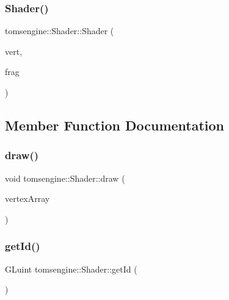 \subsubsection{\texorpdfstring{Shader()}{Shader()}}
{\footnotesize\ttfamily tomsengine\+::\+Shader\+::\+Shader (\begin{DoxyParamCaption}\item[{std\+::string}]{vert,  }\item[{std\+::string}]{frag }\end{DoxyParamCaption})}



\subsection{Member Function Documentation}
\mbox{\label{classtomsengine_1_1_shader_af63fb3f1221631fd17ee7e814eec579c}} 
\subsubsection{\texorpdfstring{draw()}{draw()}}
{\footnotesize\ttfamily void tomsengine\+::\+Shader\+::draw (\begin{DoxyParamCaption}\item[{std\+::shared\+\_\+ptr$<$ \mbox{\hyperlink{classtomsengine_1_1_vertex_array}{Vertex\+Array}} $>$}]{vertex\+Array }\end{DoxyParamCaption})}

\mbox{\label{classtomsengine_1_1_shader_aa7f2be24efa50e52bb3dfe03551e3792}} 
\subsubsection{\texorpdfstring{get\+Id()}{getId()}}
{\footnotesize\ttfamily G\+Luint tomsengine\+::\+Shader\+::get\+Id (\begin{DoxyParamCaption}{ }\end{DoxyParamCaption})}

\mbox{\label{classtomsengine_1_1_shader_a2bcc5799fdbed02cf8fc57a2db0bf1f2}} 
